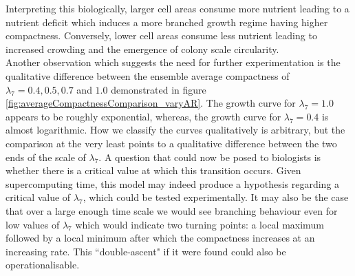 Interpreting this biologically, larger cell areas consume more nutrient leading
to a nutrient deficit which induces a more branched growth regime having higher 
compactness. Conversely, lower cell areas consume less nutrient leading 
to increased crowding and the emergence of colony scale circularity.
\\

Another observation which suggests the need for further experimentation is 
the qualitative difference between the ensemble average compactness of 
$\lambda_7 = 0.4, 0.5, 0.7$ and $1.0$ demonstrated in figure \ref{fig:averageCompactnessComparison_varyAR}.
The growth curve for $\lambda_7 = 1.0$ appears to be roughly exponential,
whereas, the growth curve for $\lambda_7 = 0.4$ is almost logarithmic.
How we classify the curves qualitatively is arbitrary,
but the comparison at the very least points to a qualitative 
difference between the two ends of the scale of $\lambda_7$. A question 
that could now be posed to biologists is whether there is a critical 
value at which this transition occurs. Given supercomputing 
time, this model may indeed produce a hypothesis regarding a critical value of $\lambda_7$,
which could be tested experimentally. It may also be the case that over a large enough 
time scale we would see branching behaviour even for low values of $\lambda_7$
which would indicate two turning points: a local maximum followed by a local minimum after which 
the compactness increases at an increasing rate. This ``double-ascent" if 
it were found could also be operationalisable.


